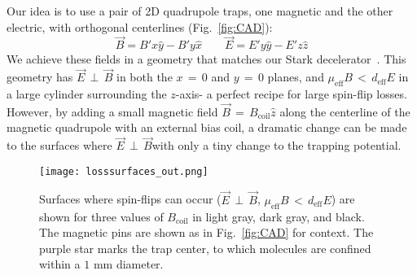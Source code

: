 \documentclass[%
 reprint,
 amsmath,amssymb,
 aps,
prl,
]{revtex4-1}
\newcommand{\bcl}{{$B_\text{coil}$}}
\newcommand{\epb}{{$\vec{E}\,{\perp}\,\vec{B}$}}
\begin{document}

Our idea is to use a pair of 2D quadrupole traps, one magnetic and the other electric, with orthogonal centerlines (Fig.~\ref{fig:CAD}):
\begin{equation}
\vec{B}=B'x\hat{y}-B'y\hat{x}\quad\quad\vec{E}=E'y\hat{y}-E'z\hat{z}
\end{equation}
We achieve these fields in a geometry that matches our Stark decelerator~\cite{Bochinski2003}. 
This geometry has \epb{} in both the $x\,{=}\,0$ and $y\,{=}\,0$ planes, and $\mu_\text{eff}B \,{<}\, d_\text{eff}E$ in a large cylinder surrounding the $z$-axis- a perfect recipe for large spin-flip losses.
However, by adding a small magnetic field $\vec{B}\,{=}\,B_\text{coil}\hat{z}$ along the centerline of the magnetic quadrupole with an external bias coil, a dramatic change can be made to the surfaces where \epb with only a tiny change to the trapping potential.


\begin{figure}[tb]
\texttt{[image: losssurfaces\_out.png]}%
\caption{
Surfaces where spin-flips can occur (\epb{}, $\mu_\text{eff}B\,{<}\,d_\text{eff}E$) are shown for three values of \bcl{} in light gray, dark gray, and black. 
The magnetic pins are shown as in Fig.~\ref{fig:CAD} for context. 
The purple star marks the trap center, to which molecules are confined within a \raisebox{2.5px}{\texttildelow} $\!\!1\text{ mm}$ diameter.
\label{fig:LSurfs}}
\end{figure}
\end{document}
